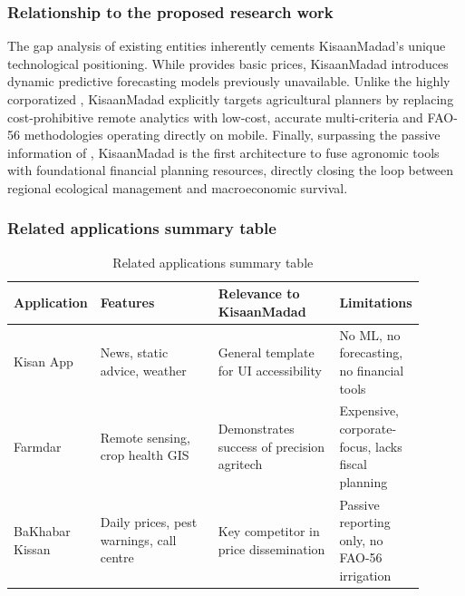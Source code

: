 \subsubsection{Relationship to the proposed research work}
The gap analysis of existing entities inherently cements KisaanMadad's unique technological positioning. While \cite{bakhabarkissan2024} provides basic prices, KisaanMadad introduces dynamic predictive forecasting models \cite{zhang2023agricultural} previously unavailable. Unlike the highly corporatized \cite{farmdar2024}, KisaanMadad explicitly targets agricultural planners by replacing cost-prohibitive remote analytics with low-cost, accurate multi-criteria and FAO-56 \cite{allen1998crop} methodologies operating directly on mobile. Finally, surpassing the passive information of \cite{kisanapp2024}, KisaanMadad is the first architecture to fuse agronomic tools with foundational financial planning resources, directly closing the loop between regional ecological management and macroeconomic survival.

\subsubsection{Related applications summary table}
\begin{table}[htbp]
  \centering
  \caption{Related applications summary table}
  \label{tab:related_apps}
  \begin{tabular}{p{0.15\linewidth} p{0.30\linewidth} p{0.30\linewidth} p{0.15\linewidth}}
    \toprule
    \textbf{Application} & \textbf{Features} & \textbf{Relevance to KisaanMadad} & \textbf{Limitations} \\
    \midrule
    Kisan App \cite{kisanapp2024} & News, static advice, weather & General template for UI accessibility & No ML, no forecasting, no financial tools \\
    Farmdar \cite{farmdar2024} & Remote sensing, crop health GIS & Demonstrates success of precision agritech & Expensive, corporate-focus, lacks fiscal planning \\
    BaKhabar Kissan \cite{bakhabarkissan2024} & Daily prices, pest warnings, call centre & Key competitor in price dissemination & Passive reporting only, no FAO-56 irrigation \\
    \bottomrule
  \end{tabular}
\end{table}
